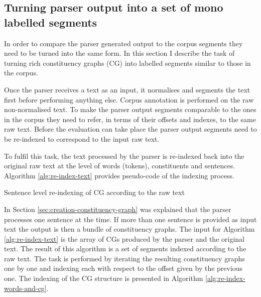 

\subsection{Turning parser output into a set of mono labelled segments}
    
    In order to compare the parser generated output to the corpus segments they need to be turned into the same form. In this section I describe the task of turning rich constituency graphs (CG) into labelled segments similar to those in the corpus. 
    
    Once the parser receives a text as an input, it normalises and segments the text first before performing anything else. Corpus annotation is performed on the raw non-normalised text. To make the parser output segments comparable to the ones in the corpus they need to refer, in terms of their offsets and indexes, to the same raw text. Before the evaluation can take place the parser output segments need to be re-indexed to correspond to the input raw text. 
    
    To fulfil this task, the text processed by the parser is re-indexed back into the original raw text at the level of words (tokens), constituents and sentences. Algorithm \ref{alg:re-index-text} provides pseudo-code of the indexing process.

    \begin{algorithm}[!ht]
        \caption{Sentence level re-indexing of CG according to the raw text}
        \label{alg:re-index-text}
    \end{algorithm}

    In Section \ref{sec:creation-constituency-graph} was explained that the parser processes one sentence at the time. If more than one sentence is provided as input text the output is then a bundle of constituency graphs. The input for Algorithm \ref{alg:re-index-text} is the array of CGs produced by the parser and the original text. The result of this algorithm is a set of segments indexed according to the raw text. The task is performed by iterating the resulting constituency graphs one by one and indexing each with respect to the offset given by the previous one. The indexing of the CG structure is presented in Algorithm \ref{alg:re-index-words-and-cg}.

